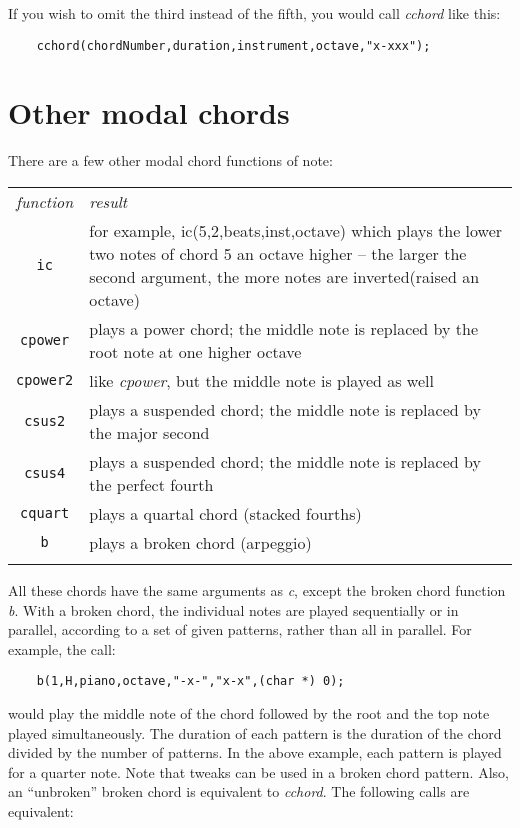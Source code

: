 \documentclass{article}
\begin{document}
If you wish to omit the third instead of the fifth, you would call
{\it cchord} like this:

\begin{verbatim}
    cchord(chordNumber,duration,instrument,octave,"x-xxx");
\end{verbatim}

\section*{Other modal chords}

There are a few other modal chord functions of note:

\begin{tabular}{cl}%
\T\toprule
{\it function} & {\it result} \\
\T\midrule
\verb!ic!           & for example, ic(5,2,beats,inst,octave) which plays the lower two notes of chord 5 an
    octave higher -- the larger the second argument, the more notes are inverted(raised an octave)\\
\verb!cpower!           &  plays a power chord; the middle note is replaced by the root note at one higher octave\\
\verb!cpower2!           &  like {\it cpower}, but the middle note is played as well\\
\verb!csus2!           &  plays a suspended chord; the middle note is replaced by the major second\\
\verb!csus4!           &  plays a suspended chord; the middle note is replaced by the perfect fourth\\
\verb!cquart!           &  plays a quartal chord (stacked fourths)\\
\verb!b!           &  plays  a broken chord (arpeggio)\\
\T\bottomrule
\end{tabular}

All these chords have the same arguments as {\it c}, except the broken chord
function {\it b}. With a broken chord, the individual notes are played
sequentially or in parallel, according to a set of given patterns, rather than
all in parallel. For example, the call:

\begin{verbatim}
    b(1,H,piano,octave,"-x-","x-x",(char *) 0);
\end{verbatim}

would play the middle note of the chord followed by the root and the
top note played simultaneously. The duration of each pattern is the
duration of the chord divided by the
number of patterns. In the above example, each pattern is played
for a quarter note.
Note that tweaks can be used in a broken chord pattern. Also, an
``unbroken'' broken chord is equivalent to {\it cchord}. The following
calls are equivalent:
\end{document}
